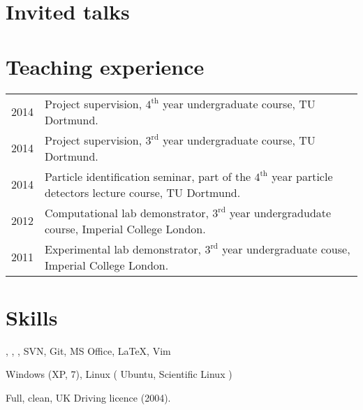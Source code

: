 \documentclass[10pt]{article}
\renewenvironment{compactitem}{
  \begin{list}{}{
    \setlength{\leftmargin}{1.5em}
  }
}{
  \end{list}
}
\begin{document}
\section*{Invited talks} 
\begin{compactitem}
\item {}
\item {}
\item {}
\item {}
\item {}
\item {}
\end{compactitem}

\section*{Teaching experience}
\begin{tabular}{ll}
    2014 & Project supervision, $4^{\text{th}}$ year undergraduate course, TU Dortmund. \\
    2014 & Project supervision, $3^{\text{rd}}$ year undergraduate course, TU Dortmund. \\
    2014 & Particle identification seminar, part of the $4^{\text{th}}$ year particle detectors lecture course, TU  Dortmund. \\
    2012 & Computational lab demonstrator, $3^{\text{rd}}$ year undergradudate course, Imperial College London. \\
    2011 & Experimental lab demonstrator, $3^{\text{rd}}$ year undergraduate couse, Imperial College London.
\end{tabular}

\section*{Skills}
\begin{compactitem}
    \item \cpp, \python, \fortran, SVN, Git, MS Office, \LaTeX, Vim
    \item Windows (XP, 7), Linux ( Ubuntu, Scientific Linux )
    \item Full, clean, UK Driving licence (2004).
\end{compactitem}


\end{document}
